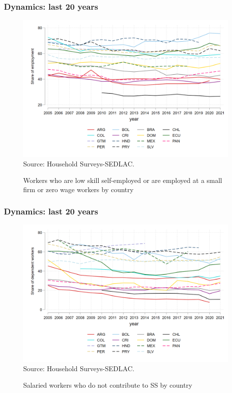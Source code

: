 \documentclass{beamer}
\begin{document}
\begin{frame}
\frametitle{Dynamics: last 20 years}
\begin{figure}[!htb]
        \justifying
        \caption{Workers who are low skill self-employed or are employed at a small firm or zero wage workers by country}     
        \includegraphics[width=0.8\linewidth]{latex/figures/Evolution/informal_pr_all.png}
        \label{fig:Evolution_informalpr}
        \centering
        \footnotesize{Source: Household Surveys-SEDLAC.}
 \end{figure}
 \end{frame}
\begin{frame}
\frametitle{Dynamics: last 20 years}
\begin{figure}[!htb]
        \justifying
        \caption{Salaried workers who do not contribute to SS by country}     
        \includegraphics[width=0.8\linewidth]{latex/figures/Evolution/informal_ss_dep_all.png}
        \label{fig:Evolution_informalssdep}
        \centering
        \footnotesize{Source: Household Surveys-SEDLAC.}
 \end{figure}
 \end{frame}
\end{document}
